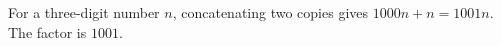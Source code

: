 For a three-digit number $n$, concatenating two copies gives $1000n+n=1001n$. The factor is $\boxed{1001}$.
